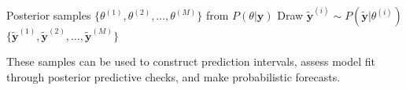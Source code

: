 \begin{algorithmbox}
\begin{algorithm}[H]
\caption{Posterior Predictive Simulation}
\begin{algorithmic}[1]
\Require Posterior samples $\{\theta^{(1)}, \theta^{(2)}, \dots, \theta^{(M)}\}$ from $P(\theta|\mathbf{y})$
    \State Draw $\tilde{\mathbf{y}}^{(i)} \sim P(\tilde{\mathbf{y}}|\theta^{(i)})$ 
\EndFor
\State \Return $\{\tilde{\mathbf{y}}^{(1)}, \tilde{\mathbf{y}}^{(2)}, \dots, \tilde{\mathbf{y}}^{(M)}\}$
\end{algorithmic}
\end{algorithm}
\end{algorithmbox}

These samples can be used to construct prediction intervals, assess model fit through posterior predictive checks, and make probabilistic forecasts.

